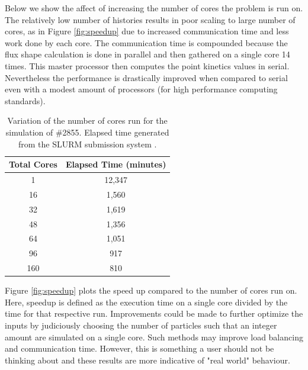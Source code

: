 \documentclass{anstrans}
\begin{document}
Below we show the affect of increasing the number of cores the problem is run on.  The relatively low number of histories results in poor scaling to large number of cores, as in Figure \ref{fig:speedup} due to increased communication time and less work done by each core.  The communication time is compounded because the flux shape calculation is done in parallel and then gathered on a single core 14 times.  This master processor then computes the point kinetics values in serial.  Nevertheless the performance is drastically improved when compared to serial even with a modest amount of processors (for high performance computing standards).  
\begin{table}[h]
    \centering
    \begin{tabular}{c|c}
                    Total Cores  & Elapsed Time (minutes) \\
                    \hline 
                    1                  &   12,347            \\
                    16                 &   1,560             \\
                    32                 &   1,619              \\
                    48                 &   1,356              \\
                    64                 &   1,051             \\
                    96                 &   917             \\
                    160                &   810             \\
                    \hline
    \end{tabular}
    \caption{Variation of the number of cores run for the simulation of \#2855. Elapsed time generated from the SLURM submission system \cite{yoo2003slurm}. }
    \label{tab:parallel}
\end{table}

Figure \ref{fig:speedup} plots the speed up compared to the number of cores run on.  Here, speedup is defined as the execution time on a single core divided by the time for that respective run.  Improvements could be made to further optimize the inputs by judiciously choosing the number of particles such that an integer amount are simulated on a single core.  Such methods may improve load balancing and communication time.  However, this is something a user should not be thinking about and these results are more indicative of "real world" behaviour. 
\end{document}
